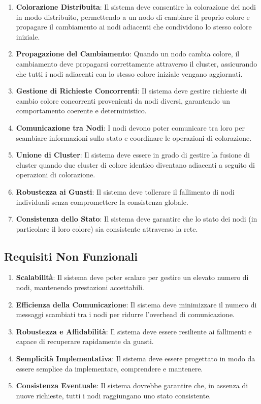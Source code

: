 \documentclass[12pt, a4paper]{report}
\begin{document}
\begin{enumerate}
    \item \textbf{Colorazione Distribuita}: Il sistema deve consentire la colorazione dei nodi in modo distribuito, permettendo a un nodo di cambiare il proprio colore e propagare il cambiamento ai nodi adiacenti che condividono lo stesso colore iniziale.
    \item \textbf{Propagazione del Cambiamento}: Quando un nodo cambia colore, il cambiamento deve propagarsi correttamente attraverso il cluster, assicurando che tutti i nodi adiacenti con lo stesso colore iniziale vengano aggiornati.
    \item \textbf{Gestione di Richieste Concorrenti}: Il sistema deve gestire richieste di cambio colore concorrenti provenienti da nodi diversi, garantendo un comportamento coerente e deterministico.
    \item \textbf{Comunicazione tra Nodi}: I nodi devono poter comunicare tra loro per scambiare informazioni sullo stato e coordinare le operazioni di colorazione.
    \item \textbf{Unione di Cluster}: Il sistema deve essere in grado di gestire la fusione di cluster quando due cluster di colore identico diventano adiacenti a seguito di operazioni di colorazione.
    \item \textbf{Robustezza ai Guasti}: Il sistema deve tollerare il fallimento di nodi individuali senza compromettere la consistenza globale.
    \item \textbf{Consistenza dello Stato}: Il sistema deve garantire che lo stato dei nodi (in particolare il loro colore) sia consistente attraverso la rete.
\end{enumerate}

\subsection{Requisiti Non Funzionali}

\begin{enumerate}
    \item \textbf{Scalabilità}: Il sistema deve poter scalare per gestire un elevato numero di nodi, mantenendo prestazioni accettabili.
    \item \textbf{Efficienza della Comunicazione}: Il sistema deve minimizzare il numero di messaggi scambiati tra i nodi per ridurre l'overhead di comunicazione.
    \item \textbf{Robustezza e Affidabilità}: Il sistema deve essere resiliente ai fallimenti e capace di recuperare rapidamente da guasti.
    \item \textbf{Semplicità Implementativa}: Il sistema deve essere progettato in modo da essere semplice da implementare, comprendere e mantenere.
    \item \textbf{Consistenza Eventuale}: Il sistema dovrebbe garantire che, in assenza di nuove richieste, tutti i nodi raggiungano uno stato consistente.
\end{enumerate}
\end{document}

